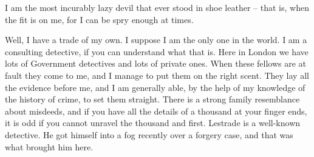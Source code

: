 \documentclass[
  name = Sherlock,
  family = Holmes,
  pic = Graphics/photo.png,
  profession = Consulting\ Detective,
  date = 06.01.1854,
  street = 221b\ Baker\ St.,
  city = London,
  web = http://www.sherlock-holmes.co.uk/,
]{vita}
\begin{document}


I am the most incurably lazy devil that ever stood in shoe leather {--} that is, when the fit is on me, for I can be spry enough at times.



Well, I have a trade of my own. I suppose I am the only one in the world. I am a consulting detective, if you can understand what that is. Here in London we have lots of Government detectives and lots of private ones. When these fellows are at fault they come to me, and I manage to put them on the right scent. They lay all the evidence before me, and I am generally able, by the help of my knowledge of the history of crime, to set them straight. There is a strong family resemblance about misdeeds, and if you have all the details of a thousand at your finger ends, it is odd if you cannot unravel the thousand and first. Lestrade is a well-known detective. He got himself into a fog recently over a forgery case, and that was what brought him here.



\begin{vitalist}


\end{vitalist}



\nocite{*}
\newrefcontext[sorting=dyt]
\printbibtabular[heading=none]
\end{document}
